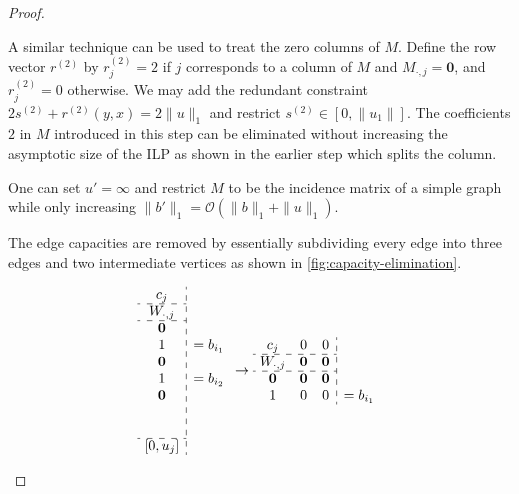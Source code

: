 \documentclass[a4paper,UKenglish,cleveref,thm-restate]{lipics-v2021}
\makeatletter
\newcommand{\veczero}{\mathbf0}
\newcommand{\vecinfty}{\bm\infty}
\renewcommand{\O}{\mathcal O}
\newenvironment{cdisplaymath}{\@fleqnfalse\begin{displaymath}}{\end{displaymath}}
\makeatother
\begin{document}
\begin{proof}
\begin{claimproof}
        A similar technique can be used to treat the zero columns of $M$. Define the row vector $r^{(2)}$ by $r_j^{(2)}=2$ if $j$ corresponds to a column of $M$ and $M_{\cdot,j}=\veczero$, and $r_j^{(2)}=0$ otherwise. We may add the redundant constraint $2s^{(2)}+r^{(2)}(y,x)=2\|u\|_1$ and restrict $s^{(2)}\in[0,\|u_1\|]$. The coefficients $2$ in $M$ introduced in this step can be eliminated without increasing the asymptotic size of the ILP as shown in the earlier step which splits the column.
    \end{claimproof}
    \begin{claim*}
        One can set $u'=\vecinfty$ and restrict $M$ to be the incidence matrix of a simple graph while only increasing $\|b'\|_1=\O(\|b\|_1+\|u\|_1)$.
    \end{claim*}
    \begin{claimproof}
        The edge capacities are removed by essentially subdividing every edge into three edges and two intermediate vertices as shown in \cref{fig:capacity-elimination}.
        \begin{figure}[H]
            \begin{cdisplaymath}
                \begin{array}{c:l}
                    c_j&\\
                    \cdashline{1-1}{}
                    W_{\cdot,j}&\\
                    \cdashline{1-1}{}
                    \veczero&\\
                    1&=b_{i_1}\\
                    \veczero&\\
                    1&=b_{i_2}\\
                    \veczero&\\
                    &\\
                    &\\
                    \cdashline{1-1}{}
                    [0,u_j]&
                \end{array}
                \to
                \begin{array}{c c c:l}
                    c_j&0&0&\\
                    \cdashline{1-3}{}
                    W_{\cdot,j}&\veczero&\veczero\\
                    \cdashline{1-3}{}
                    \veczero&\veczero&\veczero\\
                    1&0&0&=b_{i_1}\\

\end{array}
\end{cdisplaymath}
\end{figure}
\end{claimproof}
\end{proof}
\end{document}
